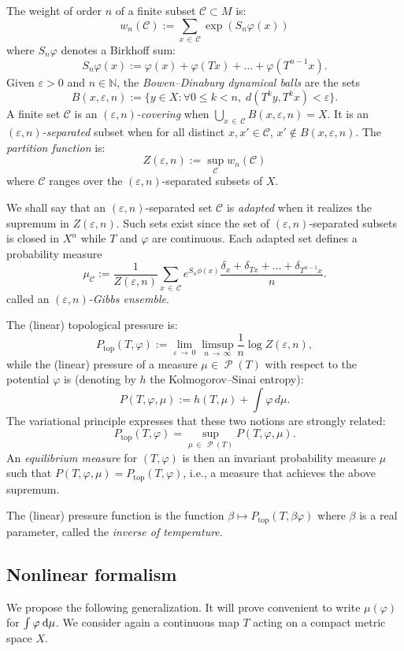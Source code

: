 \documentclass[10pt]{amsart}
\theoremstyle{definition}\newtheorem{defi}[theo]{Definition}\newtheorem{rema}[theo]{Remark}\newtheorem{exam}[theo]{Example}\newtheorem{exem}[theo]{Example}\newtheorem{nota}[theo]{Notation}
\theoremstyle{plain}
\theoremstyle{plain}
\newcommand\eps{\varepsilon}
\renewcommand\top{{\mathrm{top}}}
\newcommand\Prob{{\operatorname{\mathscr{P}}}}
\newcommand*{\dd} {\relax\ifnum\lastnodetype>0\mskip\medmuskip\fi\mathrm{d}}
\newcommand{\pot}{\varphi}
\newcommand*\be{\beta}
\newcommand*\8{\infty}
\newcommand\NN{\mathbb{N}}
\newcommand{\cC}{\mathcal C}
\let\oldforall\forall
\renewcommand*{\forall}{\mathrel{\oldforall}}
\begin{document}
The weight of order $n$ of a finite subset $\cC\subset M$ is:
\[
w_n(\cC) := \sum_{x\,\in\,\cC} \exp \left(S_n\pot(x)\right)
\]
where $S_n\pot$ denotes a Birkhoff sum:
\[
S_n\pot(x):=\pot(x)+\pot(Tx)+\dots+\pot(T^{n-1}x).
\]
Given $\eps>0$ and $n\in\NN$, the \emph{Bowen--Dinaburg dynamical balls} are the sets
\[
B(x,\eps,n):=\big\{y\in X: \forall 0\leq k<n,\; d(T^ky,T^kx)<\eps \big\}.
\]
A finite set $\cC$ is an \emph{$(\eps,n)$-covering} when $\bigcup_{x\,\in\,\cC} B(x,\eps,n)=X$. It is an \emph{$(\eps,n)$-separated} subset when for all distinct $x, x'\in \cC$, $x'\notin B(x,\eps,n)$. The \emph{partition function} is:
\[
Z(\eps,n) := \sup_{\cC} w_n(\cC)
\]
where $\cC$ ranges over the $(\eps,n)$-separated subsets of $X$.

We shall say that an $(\eps,n)$-separated set $\cC$ is \emph{adapted} when it realizes the supremum in $Z(\eps,n)$. Such sets exist since the set of $(\eps,n)$-separated subsets is closed in $X^n$ while $T$ and $\varphi$ are continuous. Each adapted set defines a probability measure
\begin{equation}
\mu_{\cC} := \frac{1}{Z(\eps,n)} \sum_{x\,\in\,\cC} e^{S_n\phi(x)} \frac{\delta_x+\delta_{Tx}+\dots+\delta_{T^{n-1}x}}{n}.
\end{equation}
called an \emph{$(\eps,n)$-Gibbs ensemble}.

The (linear) topological pressure is:
\begin{equation}\label{eq-VP-classic}
P_\top(T,\pot):=
\lim_{\eps\,\to\,0} \limsup_{n\,\to\,\infty}\frac1n\log Z(\eps,n),
\end{equation}
while the (linear) pressure of a measure $\mu\in\Prob(T)$ with respect to the potential $\pot$ is (denoting by $h$ the Kolmogorov--Sinai entropy):
\[
P(T,\pot,\mu):= h(T,\mu) + \int\pot\,d\mu.
\]
The variational principle expresses that these two notions are strongly related:
\begin{equation}\label{eq-VP}
P_\top(T,\pot) = \sup_{\mu\,\in\,\Prob(T)} P(T,\pot,\mu).
\end{equation}
An \emph{equilibrium measure} for $(T,\pot)$ is then an invariant probability measure $\mu$ such that $P(T,\pot,\mu)=P_\top(T,\pot)$, i.e., a measure that achieves the above supremum.

The (linear) pressure function is the function $\be\mapsto P_{\top}(T,\beta\pot)$ where $\be$ is a real parameter, called the \emph{inverse of temperature}.



\subsection{Nonlinear formalism}
We propose the following generalization. It will prove convenient to write $\mu(\pot)$ for $\int\pot \dd\mu$. We consider again a continuous map $T$ acting on a compact metric space $X$.
\end{document}
